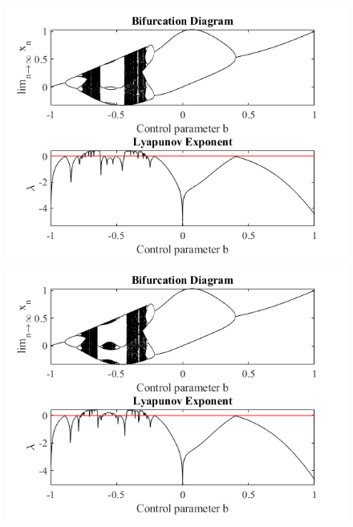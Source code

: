 \documentclass[a4paper,12pt,notitlepage]{article}
\begin{document}
\begin{figure}[h]
    \centering
        \centering
        \includegraphics[width=\textwidth]{a=7.png} 

        \centering
        \includegraphics[width=\textwidth]{a=7_25.png} 
   
\end{figure}
\end{document}
